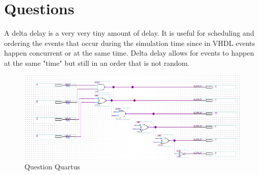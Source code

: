 \documentclass[CMPE]{KGCOEReport}
\begin{document}
\section*{Questions}
A delta delay is a very very tiny amount of delay. It is useful for scheduling and ordering the events that occur during the simulation time since in VHDL events happen concurrent or at the same time. Delta delay allows for events to happen at the same "time" but still in an order that is not random. 


\begin{figure}[H]
	\centering
	\includegraphics[width=1\textwidth]{QuartusLab11Q}
	\caption{Question Quartus}
	\label{fig:Figure 5}
\end{figure}
\end{document}
